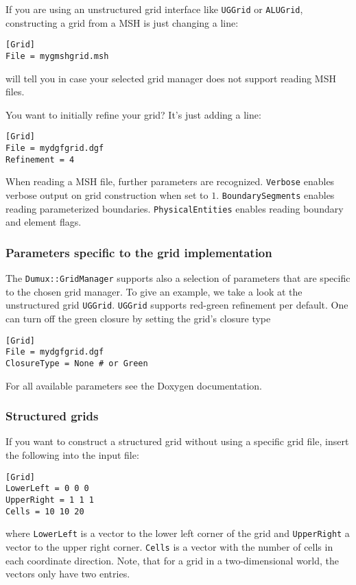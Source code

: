 If you are using an unstructured grid interface like \texttt{UGGrid} or \texttt{ALUGrid}, constructing a grid from a MSH is just changing a line:
\begin{lstlisting}[style=DumuxParameterFile]
[Grid]
File = mygmshgrid.msh
\end{lstlisting}
\Dumux will tell you in case your selected grid manager does not support reading MSH files.

You want to initially refine your grid? It's just adding a line:
\begin{lstlisting}[style=DumuxParameterFile]
[Grid]
File = mydgfgrid.dgf
Refinement = 4
\end{lstlisting}

When reading a MSH file, further parameters are recognized. \texttt{Verbose} enables verbose output on grid construction when set to $1$.
\texttt{BoundarySegments} enables reading parameterized boundaries. \texttt{PhysicalEntities} enables reading boundary and element flags.

\subsubsection{Parameters specific to the grid implementation}
The \texttt{{Dumux::GridManager}} supports also a selection of parameters that are specific to the chosen grid manager.
To give an example, we take a look at the unstructured grid \texttt{UGGrid}.
\texttt{UGGrid} supports red-green refinement per default. One can turn off the green closure by setting the grid's closure type
\begin{lstlisting}[style=DumuxParameterFile]
[Grid]
File = mydgfgrid.dgf
ClosureType = None # or Green
\end{lstlisting}

For all available parameters see the Doxygen documentation.

\subsubsection{Structured grids}
If you want to construct a structured grid without using a specific grid file, insert the following into the input file:
\begin{lstlisting}[style=DumuxParameterFile]
[Grid]
LowerLeft = 0 0 0
UpperRight = 1 1 1
Cells = 10 10 20
\end{lstlisting}
where \texttt{LowerLeft} is a vector to the lower left corner of the grid and \texttt{UpperRight} a vector to the upper right corner.
\texttt{Cells} is a vector with the number of cells in each coordinate direction. Note,  that for a grid in a two-dimensional world, the
vectors only have two entries.

